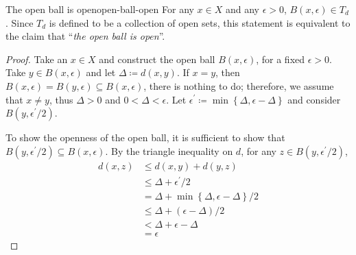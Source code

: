 \documentclass{article}
\numberwithin{equation}{section}
\numberwithin{figure}{section}
\begin{document}
\begin{theorem}{The open ball is open}{open-ball-open}
    For any $ x \in X $ and any $ \epsilon > 0 $, $ B(x, \epsilon) \in T_d $.
    Since $ T_d $ is defined to be a collection of open sets, this statement is
    equivalent to the claim that ``\emph{the open ball is open}''.
    \begin{proof}
        Take an $ x \in X $ and construct the open ball $ B(x, \epsilon) $, for
        a fixed $ \epsilon > 0 $. Take $ y \in B(x, \epsilon) $ and let $ \Delta
        \coloneq d(x, y) $. If $ x=y $, then $ B(x, \epsilon) = B(y, \epsilon)
        \subseteq B(x, \epsilon) $, there is nothing to do; therefore, we assume
        that $ x \neq y $, thus $ \Delta > 0 $ and $ 0 < \Delta < \epsilon $.
        Let $ \epsilon^\prime \coloneq \min\left\{ \Delta, \epsilon-\Delta
        \right\} $ and consider $ B(y, \epsilon^\prime/2) $.

        \begin{minipage}{.45\linewidth}
            To show the openness of the open ball, it is sufficient to show that
            $ B(y, \epsilon^\prime/2) \subseteq B(x, \epsilon) $. By the
            triangle inequality on $ d $, for any $ z \in B(y,
            \epsilon^\prime/2) $,
            \begin{align}
                d(x, z) &\leq d(x, y) + d(y, z) \\
                &\leq \Delta + \epsilon^\prime/2 \\
                &= \Delta + \min\left\{\Delta, \epsilon-\Delta\right\}/2 \\
                &\leq \Delta + (\epsilon-\Delta)/2 \\
                &< \Delta + \epsilon - \Delta \\
                &= \epsilon
            \end{align}
        \end{minipage}\hfill
        \begin{minipage}{.5\linewidth}
            \centering
        \end{minipage}


\end{proof}
\end{theorem}
\end{document}
